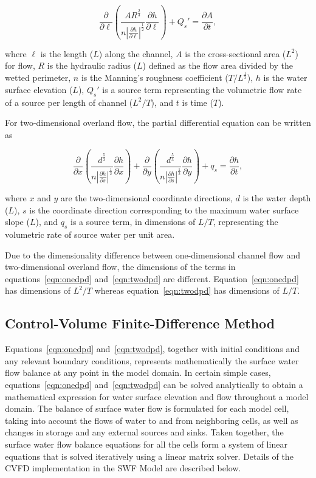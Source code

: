 \documentclass[fleqn]{article}
\begin{document}
\begin{equation}
  \frac{\partial}{\partial \ell}
  \left (
  \frac{A R^{\frac{2}{3}}}{n \left | \frac{\partial h}{\partial \ell} \right |^{\frac{1}{2}} } \frac{\partial h}{\partial \ell}
  \right )
  + Q_s'
  =   
  \frac{\partial A}{\partial t},
\label{eqn:onedpd}
\end{equation}

\noindent where $\ell$ is the length ($L$) along the channel, $A$ is the cross-sectional area  ($L^2$) for flow, $R$ is the hydraulic radius ($L$) defined as the flow area divided by the wetted perimeter, $n$ is the Manning's roughness coefficient ($T/L^{\frac{1}{3}}$), $h$ is the water surface elevation ($L$), $Q_s'$ is a source term representing the volumetric flow rate of a source per length of channel ($L^2/T$), and $t$ is time ($T$). 

For two-dimensional overland flow, the partial differential equation can be written as

\begin{equation}
  \frac{\partial}{\partial x}
  \left (
  \frac{d^{\frac{5}{3}}}{n \left | \frac{\partial h}{\partial s} \right |^{\frac{1}{2}} } \frac{\partial h}{\partial x}
  \right )
  + \frac{\partial}{\partial y}
  \left (
  \frac{d^{\frac{5}{3}}}{n \left | \frac{\partial h}{\partial s} \right |^{\frac{1}{2}} } \frac{\partial h}{\partial y}
  \right )
  + q_s
  = \frac{\partial h}{\partial t},
  \label{eqn:twodpd}
\end{equation}

\noindent where $x$ and $y$ are the two-dimensional coordinate directions, $d$ is the water depth ($L$), $s$ is the coordinate direction corresponding to the maximum water surface slope ($L$), and $q_s$ is a source term, in dimensions of $L/T$, representing the volumetric rate of source water per unit area.

Due to the dimensionality difference between one-dimensional channel flow and two-dimensional overland flow, the dimensions of the terms in equations~\ref{eqn:onedpd} and~\ref{eqn:twodpd} are different.  Equation~\ref{eqn:onedpd} has dimensions of $L^2/T$ whereas equation~\ref{eqn:twodpd} has dimensions of $L/T$.

\subsection{Control-Volume Finite-Difference Method}
Equations~\ref{eqn:onedpd} and~\ref{eqn:twodpd}, together with initial conditions and any relevant boundary conditions, represents mathematically the surface water flow balance at any point in the model domain. In certain simple cases, equations~\ref{eqn:onedpd} and~\ref{eqn:twodpd} can be solved analytically to obtain a mathematical expression for water surface elevation and flow throughout a model domain. The balance of surface water flow is formulated for each model cell, taking into account the flows of water to and from neighboring cells, as well as changes in storage and any external sources and sinks.  Taken together, the surface water flow balance equations for all the cells form a system of linear equations that is solved iteratively using a linear matrix solver. Details of the CVFD implementation in the SWF Model are described below.
\end{document}
